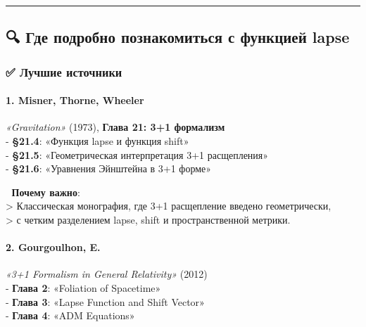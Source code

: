 \documentclass[11pt]{article}
\begin{document}
\begin{center}\rule{0.5\linewidth}{\linethickness}\end{center}

\subsection{🔍 Где подробно познакомиться с функцией
lapse}\label{ux433ux434ux435-ux43fux43eux434ux440ux43eux431ux43dux43e-ux43fux43eux437ux43dux430ux43aux43eux43cux438ux442ux44cux441ux44f-ux441-ux444ux443ux43dux43aux446ux438ux435ux439-lapse}

\subsubsection{✅ Лучшие
источники}\label{ux43bux443ux447ux448ux438ux435-ux438ux441ux442ux43eux447ux43dux438ux43aux438}

\paragraph{\texorpdfstring{1. \textbf{Misner, Thorne,
Wheeler}}{1. Misner, Thorne, Wheeler}}\label{misner-thorne-wheeler}

\emph{«Gravitation»} (1973), \textbf{Глава 21: 3+1 формализм}\\
- \textbf{§21.4}: «Функция lapse и функция shift»\\
- \textbf{§21.5}: «Геометрическая интерпретация 3+1 расщепления»\\
- \textbf{§21.6}: «Уравнения Эйнштейна в 3+1 форме»

📌 \textbf{Почему важно}:\\
\textgreater{} Классическая монография, где 3+1 расщепление введено
геометрически,\\
\textgreater{} с четким разделением lapse, shift и пространственной
метрики.

\paragraph{\texorpdfstring{2. \textbf{Gourgoulhon,
E.}}{2. Gourgoulhon, E.}}\label{gourgoulhon-e.}

\emph{«3+1 Formalism in General Relativity»} (2012)\\
- \textbf{Глава 2}: «Foliation of Spacetime»\\
- \textbf{Глава 3}: «Lapse Function and Shift Vector»\\
- \textbf{Глава 4}: «ADM Equations»
\end{document}
